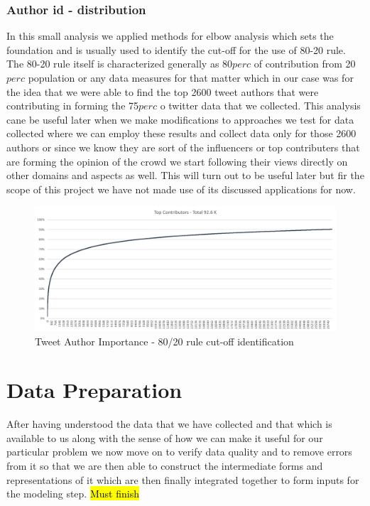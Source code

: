 \documentclass[sigconf, nonacm]{acmart}
\begin{document}
\subsubsection{Author id - distribution}
In this small analysis we applied methods for elbow analysis which sets the foundation and is usually used to identify the cut-off for the use of 80-20 rule. The 80-20 rule itself is characterized generally as 80$perc$ of contribution from 20$perc$ population or any data measures for that matter which in our case was for the idea that we were able to find the top 2600 tweet authors that were contributing in forming the 75$perc$ o twitter data that we collected. This analysis cane be useful later when we make modifications to approaches we test for data collected where we can employ these results and collect data only for those 2600 authors or since we know they are sort of the influencers or top contributers that are forming the opinion of the crowd we start following their views directly on other domains and aspects as well. This will turn out to be useful later but fir the scope of this project we have not made use of its discussed applications for now.
\begin{figure}[H]
  \centering
  \includegraphics[width=\linewidth]{images/author.png}
  \caption{Tweet Author Importance - 80/20 rule cut-off identification}
\end{figure}



\section{Data Preparation}
After having understood the data that we have collected and that which is available to us along with the sense of how we can make it useful for our particular problem we now move on to verify data quality and to remove errors from it so that we are then able to construct the intermediate forms and representations of it which are then finally integrated together to form inputs for the modeling step.
\hl{Must finish}
\end{document}
